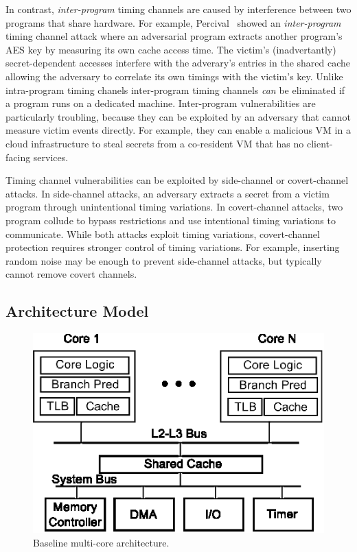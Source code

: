 In contrast, {\em inter-program} timing channels are caused by interference 
between two programs that share hardware.
For example, Percival~\cite{percival} showed an {\em inter-program} timing 
channel attack where an adversarial program extracts another program's AES key
by measuring its own cache access time. The victim's (inadvertantly)
secret-dependent accesses interfere with the adverary's entries in the shared
cache allowing the adversary to correlate its own timings with the victim's key. 
Unlike intra-program timing chanels inter-program timing channels {\em can} be
eliminated if a program runs on a dedicated machine. Inter-program 
vulnerabilities are particularly troubling, because they can be exploited by an 
adversary that cannot measure victim events directly. For example, they can 
enable a malicious VM in a cloud infrastructure to steal secrets from a
co-resident VM that has no client-facing services.~\cite{heyyou}

Timing channel vulnerabilities can be exploited by side-channel or 
covert-channel attacks. In side-channel attacks, an adversary extracts a secret from
a victim program through unintentional timing variations.
In covert-channel attacks, two program collude to bypass restrictions and use
intentional timing variations to communicate.
While both attacks exploit timing variations, covert-channel protection requires
stronger control of timing variations. For example, inserting random noise may be
enough to prevent side-channel attacks, but typically cannot remove covert channels.

\subsection{Architecture Model}


    \begin{figure}
        \begin{center}
            \includegraphics{figs/baseline.eps}
            \caption{Baseline multi-core architecture.}
            \label{fig:baseline}
        \end{center}
    \end{figure}

